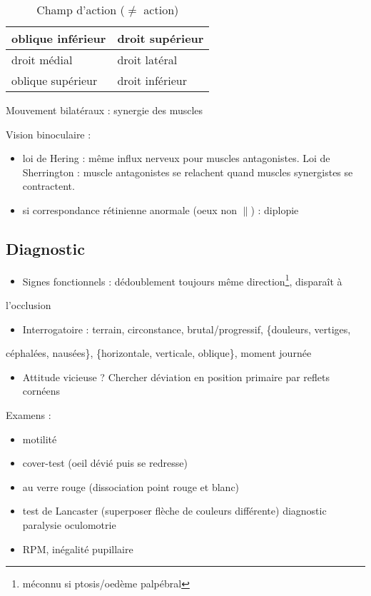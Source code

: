 \documentclass[11pt]{article}
\begin{document}
\begin{table}[htbp]
\caption{Champ d'action (\danger \(\ne\) action)}
\centering
\begin{tabular}{ll}
\toprule
oblique inférieur & droit supérieur\\
\midrule
droit médial & droit latéral\\
\midrule
oblique supérieur & droit inférieur\\
\bottomrule
\end{tabular}
\end{table}

Mouvement bilatéraux : synergie des muscles

Vision binoculaire :
\begin{itemize}
\item loi de Hering : même influx nerveux pour muscles antagonistes. Loi de
Sherrington : muscle antagonistes se relachent quand muscles synergistes se
contractent.
\item si correspondance rétinienne anormale (oeux non \(\parallel\)) : diplopie
\end{itemize}

\subsection{Diagnostic}
\label{sec:orga15c939}
\begin{itemize}
\item Signes fonctionnels : dédoublement toujours même direction\footnote{\danger méconnu si ptosis/oedème palpébral}, disparaît à
\end{itemize}
l'occlusion
\begin{itemize}
\item Interrogatoire : terrain, circonstance, brutal/progressif, \{douleurs, vertiges,
\end{itemize}
céphalées, nausées\}, \{horizontale, verticale, oblique\}, moment journée
\begin{itemize}
\item Attitude vicieuse ? Chercher déviation en position primaire par reflets
cornéens
\end{itemize}

Examens :
\begin{itemize}
\item motilité
\item cover-test (oeil dévié puis se redresse)
\item au verre rouge (dissociation point rouge et blanc)
\item test de Lancaster (superposer flèche de couleurs différente) \thus diagnostic
paralysie oculomotrie
\item RPM, inégalité pupillaire
\end{itemize}
\end{document}
